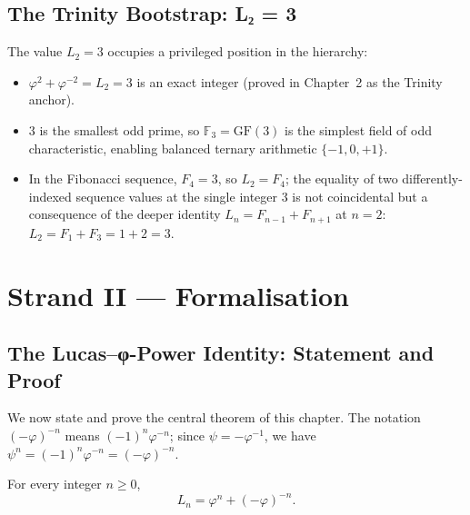 \subsection{The Trinity Bootstrap: L₂ = 3}
\label{subsec:gh-trinity-bootstrap}

The value \(L_2 = 3\) occupies a privileged position in the hierarchy:
\begin{itemize}
  \item \(\varphi^2 + \varphi^{-2} = L_2 = 3\) is an exact integer
        (proved in Chapter~2 as the Trinity anchor).
  \item \(3\) is the smallest odd prime, so \(\mathbb{F}_3 = \text{GF}(3)\)
        is the simplest field of odd characteristic, enabling balanced
        ternary arithmetic \(\{-1, 0, +1\}\).
  \item In the Fibonacci sequence, \(F_4 = 3\), so \(L_2 = F_4\);
        the equality of two differently-indexed sequence values at the
        single integer \(3\) is not coincidental but a consequence of
        the deeper identity \(L_n = F_{n-1} + F_{n+1}\) at \(n = 2\):
        \(L_2 = F_1 + F_3 = 1 + 2 = 3\).
\end{itemize}

\section{Strand II — Formalisation}
\label{sec:gh-strand2}

\subsection{The Lucas–φ-Power Identity: Statement and Proof}
\label{subsec:gh-lucas-phi-main}

We now state and prove the central theorem of this chapter.
The notation \((-\varphi)^{-n}\) means \((-1)^n \varphi^{-n}\);
since \(\psi = -\varphi^{-1}\), we have
\(\psi^n = (-1)^n \varphi^{-n} = (-\varphi)^{-n}\).

\begin{theorem}%
\label{thm:gh-lucas-phi-power}
For every integer \(n \geq 0\),
\begin{equation}\label{eq:gh-lucas-phi}
  L_n = \varphi^n + (-\varphi)^{-n}.
\end{equation}
\end{theorem}


